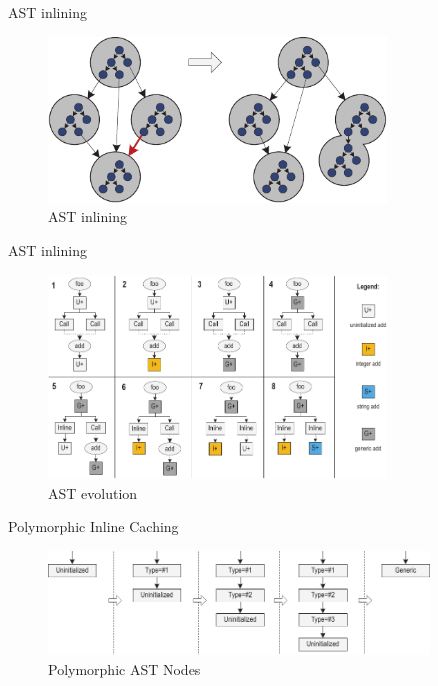 \documentclass[xcolor=dvipsname]{beamer}
\begin{document}
\begin{frame}[fragile]{AST inlining}
  \begin{figure}
    \centering
    \includegraphics[width=0.8\textwidth]{image02-2.pdf}
    \caption{AST inlining}
    \label{fig:inlining}
  \end{figure}
\end{frame}

\begin{frame}[fragile]{AST inlining}
  \begin{figure}
    \centering
    \includegraphics[width=0.8\textwidth]{image01-2.pdf}
    \caption{AST evolution}
    \label{fig:inlining2}
  \end{figure}
\end{frame}

\begin{frame}{Polymorphic Inline Caching}
  \begin{figure}
    \centering
    \includegraphics[width=0.9\textwidth]{poly.pdf}
    \caption{Polymorphic AST Nodes}
    \label{fig:poly}
  \end{figure}
\end{frame}
\end{document}
